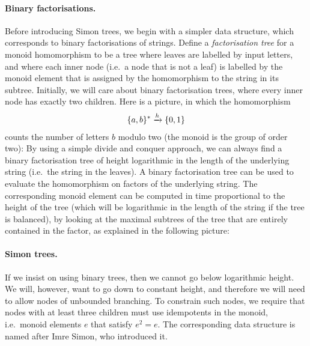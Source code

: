 \paragraph*{Binary factorisations.} Before introducing Simon trees, we begin with a simpler data structure, which corresponds to binary factorisations of strings. Define a \emph{factorisation tree} for a monoid homomorphism to be a tree where leaves are labelled by input letters, and where each inner node (i.e.~a node that is not a leaf) is labelled by  the monoid element that is assigned by the homomorphism to  the string in its subtree.  Initially, we will care about binary factorisation trees, where every inner node has exactly two children. Here is a picture, in which the homomorphism 
\begin{align*}
\{a,b\}^* \xrightarrow h \{0,1\}
\end{align*}
counts the number of letters $b$ modulo two (the monoid is the group of order two):
By using a simple divide and conquer approach, we can always find a binary factorisation tree of height logarithmic in the length of the underlying string (i.e.~the string in the leaves). 
A binary factorisation tree can be used to evaluate the homomorphism on factors of the underlying string.  The corresponding monoid element can be computed in time proportional to the height of the tree (which will be logarithmic in the length of the string if the tree is balanced), by looking at the maximal subtrees of the tree that are entirely contained in the factor, as explained in the following picture:


\paragraph*{Simon trees.} If we insist on using binary trees, then we cannot go below logarithmic height. We will, however, want to go down to constant height, and therefore we will need to  allow nodes of unbounded branching.  To constrain such nodes, we require that nodes with at least three children must use idempotents in the monoid, i.e.~monoid elements $e$ that satisfy $e^2 = e$.  The corresponding data structure is named after Imre Simon, who introduced it. 

